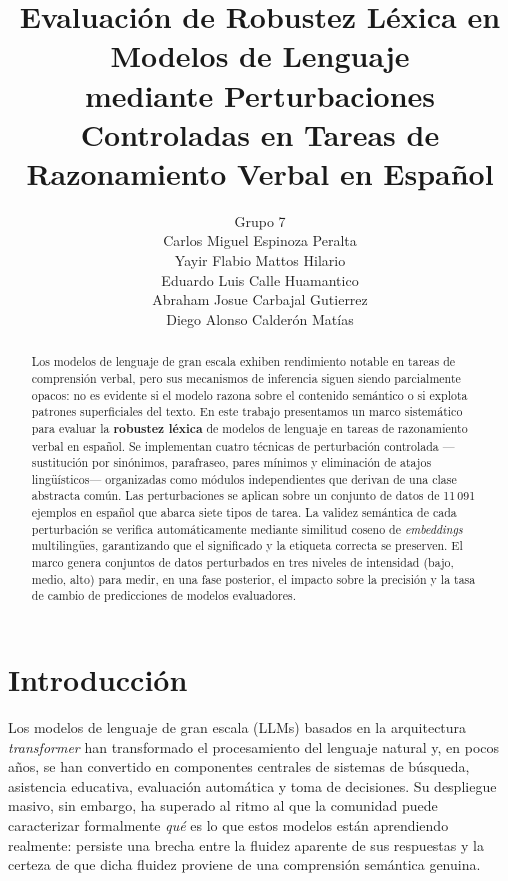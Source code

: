 \documentclass[11pt]{article}
\title{Evaluación de Robustez Léxica en Modelos de Lenguaje\\
  mediante Perturbaciones Controladas en Tareas de\\
  Razonamiento Verbal en Español}
\author{
  Grupo 7 \\
    Carlos Miguel Espinoza Peralta \\
    Yayir Flabio Mattos Hilario \\
    Eduardo Luis Calle Huamantico \\
    Abraham Josue Carbajal Gutierrez \\
    Diego Alonso Calderón Matías \\
  }
\begin{document}
\maketitle

\begin{abstract}
Los modelos de lenguaje de gran escala exhiben rendimiento notable en tareas de
comprensión verbal, pero sus mecanismos de inferencia siguen siendo parcialmente
opacos: no es evidente si el modelo razona sobre el contenido semántico o si
explota patrones superficiales del texto.
En este trabajo presentamos un marco sistemático para evaluar la
\textbf{robustez léxica} de modelos de lenguaje en tareas de razonamiento verbal
en español.
Se implementan cuatro técnicas de perturbación controlada —sustitución por
sinónimos, parafraseo, pares mínimos y eliminación de atajos lingüísticos—
organizadas como módulos independientes que derivan de una clase abstracta común.
Las perturbaciones se aplican sobre un conjunto de datos de 11\,091 ejemplos en
español que abarca siete tipos de tarea.
La validez semántica de cada perturbación se verifica automáticamente mediante
similitud coseno de \textit{embeddings} multilingües, garantizando que el
significado y la etiqueta correcta se preserven.
El marco genera conjuntos de datos perturbados en tres niveles de intensidad
(bajo, medio, alto) para medir, en una fase posterior, el impacto sobre la
precisión y la tasa de cambio de predicciones de modelos evaluadores.
\end{abstract}

\section{Introducción}
\label{sec:intro}


Los modelos de lenguaje de gran escala (LLMs) basados en la arquitectura
\textit{transformer} \citep{devlin-etal-2019-bert} han transformado el
procesamiento del lenguaje natural y, en pocos años, se han convertido en
componentes centrales de sistemas de búsqueda, asistencia educativa,
evaluación automática y toma de decisiones.
Su despliegue masivo, sin embargo, ha superado al ritmo al que la comunidad
puede caracterizar formalmente \emph{qué} es lo que estos modelos están
aprendiendo realmente: persiste una brecha entre la fluidez aparente de sus
respuestas y la certeza de que dicha fluidez proviene de una comprensión
semántica genuina.
\end{document}
